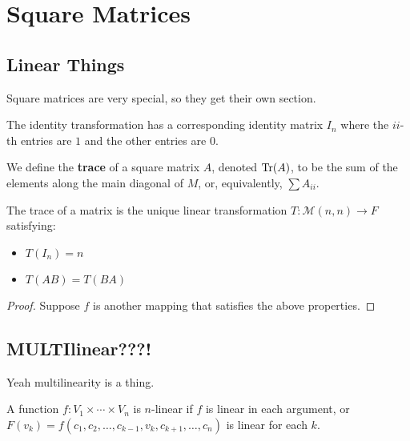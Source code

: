 \section{Square Matrices}
\subsection{Linear Things}
Square matrices are very special, so they get their own section.

\begin{df}
The identity transformation has a corresponding identity matrix $I_n$
where the $ii$-th entries are $1$ and the other entries are $0$.
\end{df}

\begin{df}
We define the \textbf{trace} of a square matrix $A$, denoted $\operatorname{Tr}(A)$,
to be the sum of the elements along the main diagonal of $M$, or,
equivalently, $\sum A_{ii}$.
\end{df}

\begin{prop}
The trace of a matrix is the unique linear transformation $T :
\mathcal{M}(n, n) \rightarrow F$ satisfying:
\begin{itemize}
\item $T(I_n) = n$
\item $T(AB) = T(BA)$
\end{itemize}
\end{prop}

\begin{proof}
Suppose $f$ is another mapping that satisfies the above properties.
\end{proof}

\subsection{MULTIlinear???!}
Yeah multilinearity is a thing.

\begin{df}
A function $f : V_1 \times \cdots \times V_n$ is $n$-linear if $f$ is
linear in each argument, or $F(v_k) = f(c_1, c_2, \dots, c_{k - 1}, v_k,
c_{k + 1}, \dots, c_n)$ is linear for each $k$.
\end{df}
